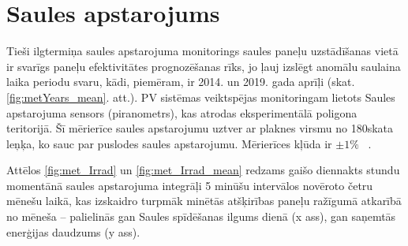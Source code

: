 \section{Saules apstarojums}


Tieši ilgtermiņa saules apstarojuma monitorings saules paneļu uzstādīšanas vietā ir svarīgs paneļu efektivitātes prognozēšanas rīks, jo ļauj izslēgt anomālu saulaina laika periodu svaru, kādi, piemēram, ir 2014. un 2019. gada aprīļi (skat. \ref{fig:metYears_mean}. att.). PV sistēmas veiktspējas monitoringam lietots Saules apstarojuma sensors (piranometrs), kas atrodas eksperimentālā poligona teritorijā. Šī mērierīce saules apstarojumu uztver ar plaknes virsmu no 180\textdegree skata leņķa, ko sauc par puslodes saules apstarojumu. Mērierīces kļūda ir  $\pm 1 \%$ ~\cite{pyranometer}.

Attēlos \ref{fig:met_Irrad} un \ref{fig:met_Irrad_mean} redzams gaišo diennakts stundu momentānā saules apstarojuma integrāļi 5 minūšu intervālos novēroto četru mēnešu laikā, kas izskaidro turpmāk minētās atšķirības paneļu ražīgumā atkarībā no mēneša -- palielinās gan Saules spīdēšanas ilgums dienā (x ass), gan saņemtās enerģijas daudzums (y ass).

